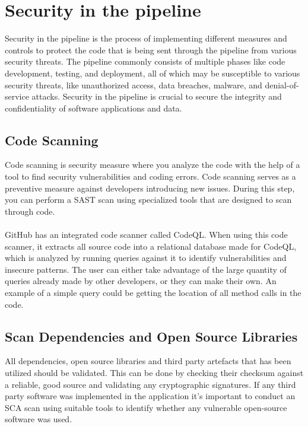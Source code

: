 \section{Security in the pipeline}
Security in the pipeline is the process of implementing different measures and controls to protect the code that is being sent through the pipeline from various security threats. The pipeline commonly consists of multiple phases like code development, testing, and deployment, all of which may be susceptible to various security threats, like unauthorized access, data breaches, malware, and denial-of-service attacks. Security in the pipeline is crucial to secure the integrity and confidentiality of software applications and data.

\subsection{Code Scanning}
Code scanning is security measure where you analyze the code with the help of a tool to find security vulnerabilities and coding errors. Code scanning serves as a preventive measure against developers introducing new issues. During this step, you can perform a SAST scan using specialized tools that are designed to scan through code. 
\\~\\
GitHub has an integrated code scanner called CodeQL. When using this code scanner, it extracts all source code into a relational database made for CodeQL, which is analyzed by running queries against it to identify vulnerabilities and insecure patterns. The user can either take advantage of the large quantity of queries already made by other developers, or they can make their own. An example of a simple query could be getting the location of all method calls in the code. 
 \cite{codeql}
\subsection{Scan Dependencies and Open Source Libraries}
All dependencies, open source libraries and third party artefacts that has been utilized should be validated. This can be done by checking their checksum against a reliable, good source and validating any cryptographic signatures. If any third party software was implemented in the application it's important to conduct an SCA scan using suitable tools to identify whether any vulnerable open-source software was used. \cite{bestpracticeSupplyChain}

